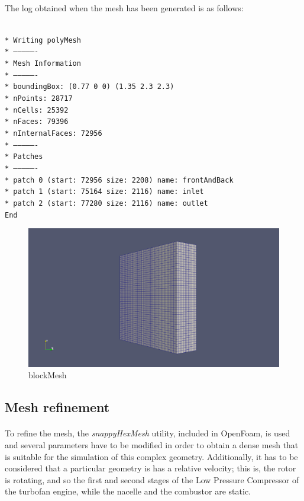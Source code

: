 \paragraph{}The log obtained when the mesh has been generated is as follows:

\texttt{\\*
Writing polyMesh\\*
----------------\\*
Mesh Information\\*
----------------\\*
  boundingBox: (0.77 0 0) (1.35 2.3 2.3)\\*
  nPoints: 28717\\*
  nCells: 25392\\*
  nFaces: 79396\\*
  nInternalFaces: 72956\\*
----------------\\*
Patches\\*
----------------\\*
  patch 0 (start: 72956 size: 2208) name: frontAndBack\\*
  patch 1 (start: 75164 size: 2116) name: inlet\\*
  patch 2 (start: 77280 size: 2116) name: outlet\\
  End
}



\begin{figure}[h]
\includegraphics[scale=0.26]{./mesh/screenshots/blockmesh}
\centering
\caption{blockMesh}
\end{figure}

\subsection{Mesh refinement}

\paragraph{}To refine the mesh, the \textit{snappyHexMesh} utility, included in OpenFoam, is used and several parameters have to be modified in order to obtain a dense mesh that is suitable for the simulation of this complex geometry. Additionally, it has to be considered that a particular geometry is has a relative velocity; this is, the rotor is rotating, and so the first and second stages of the Low Pressure Compressor of the turbofan engine, while the nacelle and the combustor are static. 
